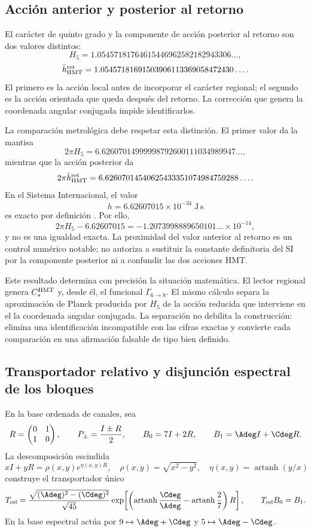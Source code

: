 \subsection{Acción anterior y posterior al retorno}

El carácter de quinto grado y la componente de acción posterior al retorno
son dos valores distintos:
\[
H_5
=1.05457181764615446962582182943306\ldots,
\]
\[
\bar h_{\rm HMT}^{\rm ret}
=1.05457181691503906113369058472430\ldots.
\]
El primero es la acción local antes de incorporar el carácter regional; el
segundo es la acción orientada que queda después del retorno. La corrección
que genera la coordenada angular conjugada impide identificarlos.

La comparación metrológica debe respetar esta distinción. El primer valor da
la mantisa
\[
2\pi H_5
=6.62607014999998792600111034989947\ldots,
\]
mientras que la acción posterior da
\[
2\pi\bar h_{\rm HMT}^{\rm ret}
=6.62607014540625433351074984759288\ldots.
\]
En el Sistema Internacional, el valor
\[
h=6.62607015\times10^{-34}\;\mathrm{J\,s}
\]
es exacto por definición \cite{BIPMSI}. Por ello,
\[
2\pi H_5-6.62607015
=-1.2073998889650101\ldots\times10^{-14},
\]
y no es una igualdad exacta. La proximidad del valor anterior al retorno es
un control numérico notable; no autoriza a sustituir la constante definitoria
del SI por la componente posterior ni a confundir las dos acciones HMT\@.

Este resultado determina con precisión la situación matemática. El lector
regional genera \(C_*^{\rm HMT}\) y, desde él, el funcional
\(\Gamma_{6\to8}\). El mismo cálculo separa la aproximación de Planck
producida por \(H_5\) de la acción reducida que interviene en el
la coordenada angular conjugada. La separación no debilita la construcción: elimina una
identificación incompatible con las cifras exactas y convierte cada
comparación en una afirmación falsable de tipo bien definido.

\subsection{Transportador relativo y disjunción espectral de los bloques}
\label{p12-83-c13-s3:sec:transportador-relativo-split}

En la base ordenada de canales, sea
\[
 R=\begin{pmatrix}0&1\\1&0\end{pmatrix},
 \qquad P_\pm=\frac{I\pm R}{2},
 \qquad
 B_0=7I+2R,
 \qquad B_1=\Adeg I+\Cdeg R.
\]
La descomposición escindida
\[
 xI+yR=\rho(x,y)e^{\eta(x,y)R},
 \quad \rho(x,y)=\sqrt{x^2-y^2},
 \quad \eta(x,y)=\operatorname{artanh}(y/x)
\]
construye el transportador único
\[
 T_{\rm rel}
 =\frac{\sqrt{(\Adeg)^2-(\Cdeg)^2}}{\sqrt{45}}
   \exp\!\left[
   \left(\operatorname{artanh}\frac{\Cdeg}{\Adeg}
   -\operatorname{artanh}\frac27\right)R\right],
 \qquad T_{\rm rel}B_0=B_1.
\]
En la base espectral actúa por
\(9\mapsto\Adeg+\Cdeg\) y
\(5\mapsto\Adeg-\Cdeg\).

